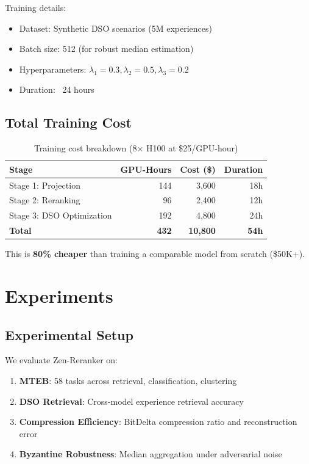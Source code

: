 \documentclass[11pt,letterpaper]{article}
\begin{document}
Training details:
\begin{itemize}
    \item Dataset: Synthetic DSO scenarios (5M experiences)
    \item Batch size: 512 (for robust median estimation)
    \item Hyperparameters: $\lambda_1 = 0.3, \lambda_2 = 0.5, \lambda_3 = 0.2$
    \item Duration: ~24 hours
\end{itemize}

\subsection{Total Training Cost}

\begin{table}[h]
\centering
\begin{tabular}{lrrr}
\toprule
\textbf{Stage} & \textbf{GPU-Hours} & \textbf{Cost (\$)} & \textbf{Duration} \\
\midrule
Stage 1: Projection & 144 & 3,600 & 18h \\
Stage 2: Reranking & 96 & 2,400 & 12h \\
Stage 3: DSO Optimization & 192 & 4,800 & 24h \\
\midrule
\textbf{Total} & \textbf{432} & \textbf{10,800} & \textbf{54h} \\
\bottomrule
\end{tabular}
\caption{Training cost breakdown (8× H100 at \$25/GPU-hour)}
\end{table}

This is \textbf{80\% cheaper} than training a comparable model from scratch (\$50K+).

\section{Experiments}

\subsection{Experimental Setup}

We evaluate Zen-Reranker on:
\begin{enumerate}
    \item \textbf{MTEB}: 58 tasks across retrieval, classification, clustering
    \item \textbf{DSO Retrieval}: Cross-model experience retrieval accuracy
    \item \textbf{Compression Efficiency}: BitDelta compression ratio and reconstruction error
    \item \textbf{Byzantine Robustness}: Median aggregation under adversarial noise
\end{enumerate}
\end{document}
